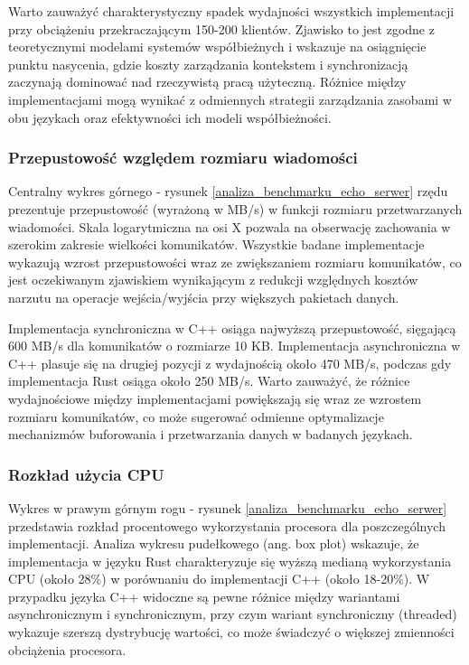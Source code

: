 Warto zauważyć charakterystyczny spadek wydajności wszystkich implementacji przy obciążeniu przekraczającym 150-200 klientów. Zjawisko to jest zgodne z teoretycznymi modelami systemów współbieżnych i wskazuje na osiągnięcie punktu nasycenia, gdzie koszty zarządzania kontekstem i synchronizacją zaczynają dominować nad rzeczywistą pracą użyteczną. Różnice między implementacjami mogą wynikać z odmiennych strategii zarządzania zasobami w obu językach oraz efektywności ich modeli współbieżności.

\subsubsection{Przepustowość względem rozmiaru wiadomości}
Centralny wykres górnego - rysunek \ref{analiza_benchmarku_echo_serwer} rzędu prezentuje przepustowość (wyrażoną w MB/s) w funkcji rozmiaru przetwarzanych wiadomości. Skala logarytmiczna na osi X pozwala na obserwację zachowania w szerokim zakresie wielkości komunikatów. Wszystkie badane implementacje wykazują wzrost przepustowości wraz ze zwiększaniem rozmiaru komunikatów, co jest oczekiwanym zjawiskiem wynikającym z redukcji względnych kosztów narzutu na operacje wejścia/wyjścia przy większych pakietach danych.

Implementacja synchroniczna w C++ osiąga najwyższą przepustowość, sięgającą 600 MB/s dla komunikatów o rozmiarze 10 KB. Implementacja asynchroniczna w C++ plasuje się na drugiej pozycji z wydajnością około 470 MB/s, podczas gdy implementacja Rust osiąga około 250 MB/s. Warto zauważyć, że różnice wydajnościowe między implementacjami powiększają się wraz ze wzrostem rozmiaru komunikatów, co może sugerować odmienne optymalizacje mechanizmów buforowania i przetwarzania danych w badanych językach.

\subsubsection{Rozkład użycia CPU}
Wykres w prawym górnym rogu - rysunek \ref{analiza_benchmarku_echo_serwer} przedstawia rozkład procentowego wykorzystania procesora dla poszczególnych implementacji. Analiza wykresu pudełkowego (ang. box plot) wskazuje, że implementacja w języku Rust charakteryzuje się wyższą medianą wykorzystania CPU (około 28\%) w porównaniu do implementacji C++ (około 18-20\%). W przypadku języka C++ widoczne są pewne różnice między wariantami asynchronicznym i synchronicznym, przy czym wariant synchroniczny (threaded) wykazuje szerszą dystrybucję wartości, co może świadczyć o większej zmienności obciążenia procesora.

